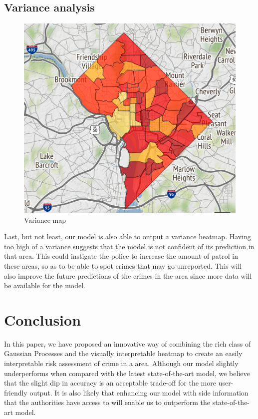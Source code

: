 \documentclass[letterpaper]{article}
\begin{document}
	\subsection{Variance analysis}
	\begin{figure}[!ht]
		\includegraphics[width=\linewidth]{./w22_variance.png}
		\caption{Variance map}
		\label{p5}
	\end{figure}
	Last, but not least, our model is also able to output a variance heatmap. Having too high of a variance suggests that the model is not confident of its prediction in that area. This could instigate the police to increase the amount of patrol in these areas, so as to be able to spot crimes that may go unreported. This will also improve the future predictions of the crimes in the area since more data will be available for the model.
	
	\section{Conclusion}
	In this paper, we have proposed an innovative way of combining the rich class of Gaussian Processes and the visually interpretable heatmap to create an easily interpretable risk assessment of crime in a area.
	Although our model slightly underperforms when compared with the latest state-of-the-art model, we believe that the slight dip in accuracy is an acceptable trade-off for the more user-friendly output.
	It is also likely that enhancing our model with side information that the authorities have access to will enable us to outperform the state-of-the-art model.
	
\end{document}
